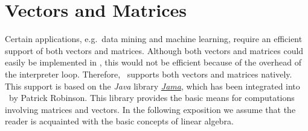 \chapter{Vectors and Matrices \label{chapter:linear-algebra.tex}}
Certain applications, e.g.~data mining and machine learning, require an efficient support of both
vectors and matrices. 
Although both vectors and matrices could easily be implemented in \setlx, this would not be
efficient because of the overhead of the interpreter loop.  Therefore, \setlx\ supports both vectors and
matrices natively.  This support is based on the \textsl{Java} library 
\href{http://math.nist.gov/javanumerics/jama/}{\textsl{Jama}}, which has been integrated into
\setlx\ by Patrick Robinson.  This library provides the basic means for computations involving
matrices and vectors.  In the following exposition we assume that the reader is acquainted with the
basic concepts of linear algebra.

